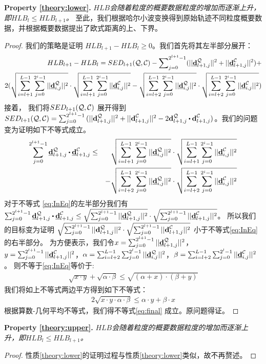 \textbf{Property \ref{theory:lower}. }{\em $HLB$会随着粒度的概要数据粒度的增加而逐渐上升，即$HLB_{l} \le HLB_{l+1}$。}
至此，我们根据哈尔小波变换得到原始轨迹不同粒度概要数据，并根据概要数据提出了欧式距离的上、下界。



\begin{proof}\label{proof:p2}
	我们的策略是证明 $HLB_{l+1}- HLB_{l}\ge 0$。我们首先将其左半部分展开：
	\begin{eqnarray}\label{eq:minus}
HLB_{l+1}- HLB_{l}= SED_{l+1}({\cal Q},{\cal C}) - \sum\nolimits_{j=0}^{2^{l+1}-1}(||\emph{{\textbf{d}}}_{l+1,j}^{\cal Q}||^2  + ||\emph{{\textbf{d}}}_{l+1,j}^{\cal C}||^2)+\nonumber\\
 2(\sqrt{\sum_{i=l+1}^{L -1}\sum_{j=0}^{2^i-1}||\emph{{\textbf{d}}}_{i,j}^{\cal Q}||^2} \cdot \sqrt{\sum_{i=l+1}^{L -1}\sum_{j=0}^{2^i-1}||\emph{{\textbf{d}}}_{i,j}^{\cal C}||^2} -\sqrt{\sum_{i=l+2}^{L -1}\sum_{j=0}^{2^i-1}||\emph{{\textbf{d}}}_{i,j}^{\cal Q}||^2} \cdot \sqrt{\sum_{i=l+2}^{L -1}\sum_{j=0}^{2^i-1}||\emph{{\textbf{d}}}_{i,j}^{\cal C}||^2})\nonumber
	\end{eqnarray}	
	接着， 我们将$SED_{l+1}({\cal Q},{\cal C})$ 展开得到$SED_{l+1}({\cal Q},{\cal C})=\sum_{j=0}^{2^{l+1}-1}{(||\bd_{l+1,j}^{\cal Q}||^2+||\bd_{l+1,j}^{\cal C}||^2}-2 \bd_{l+1,j}^{\cal Q} \bigcdot \bd_{l+1,j}^{\cal C})$。我们的问题变为证明如下不等式成立。
	\begin{eqnarray}\label{eq:InEq}
	\sum_{j=0}^{2^{l+1}-1}\vd_{l+1,j}^{\cal Q} \bigcdot \vd_{l+1,j}^{\cal C} &\le& \sqrt{\sum_{i=l+1}^{L-1}\sum_{j=0}^{2^i-1}||\vd_{i,j}^{\cal Q}||^2} \cdot \sqrt{\sum_{i=l+1}^{L-1}\sum_{j=0}^{2^i-1}||\vd_{i,j}^{\cal C}||^2} \nonumber\\
&\quad&	-	\sqrt{\sum_{i=l+2}^{L-1}\sum_{j=0}^{2^i-1}||\vd_{i,j}^{\cal Q}||^2} \cdot \sqrt{\sum_{i=l+2}^{L-1}\sum_{j=0}^{2^i-1}||\vd_{i,j}^{\cal C}||^2} 
	\end{eqnarray}	
	对于不等式 \ref{eq:InEq}的左半部分我们有
	$\sum_{j=0}^{2^{l+1}-1}\vd_{l+1,j}^{\cal Q}\bigcdot \vd_{l+1,j}^{\cal C} \le
	\sqrt{\sum_{j=0}^{2^{l+1}-1}||\vd_{l+1,j}^{\cal Q}||^2} \cdot \sqrt{\sum_{j=0}^{2^{l+1}-1}||\vd_{l+1,j}^{\cal C}||^2}$。
	所以我们的目标变为证明
	$\sqrt{\sum_{j=0}^{2^{l+1}-1}||\textbf{d}_{l+1,j}^{\cal Q}||^2} \cdot \sqrt{\sum_{j=0}^{2^{l+1}-1}||\textbf{d}_{l+1,j}^{\cal C}||^2}$
	小于不等式\ref{eq:InEq}的右半部分。
	为方便表示，我们令$x= \sum_{j=0}^{2^{l+1}-1}||\emph{{\textbf{d}}}_{l+1,j}^{\cal Q}||^2$，$y=\sum_{j=0}^{2^{l+1}-1}||\emph{{\textbf{d}}}_{l+1,j}^{\cal C}||^2$，$\alpha = \sum_{i=l+2}^{L-1}\sum_{j=0}^{2^l-1}||\emph{{\textbf{d}}}_{i,j}^{\cal Q}||^2$，$\beta =  \sum_{i=l+2}^{L-1}\sum_{j=0}^{2^l-1}||\emph{{\textbf{d}}}_{i,j}^{\cal C}||^2$。
	则不等于\ref{eq:InEq}等价于:
	\begin{eqnarray}\label{eq:sim}
	\sqrt{x \cdot y} + \sqrt{\alpha \cdot \beta} \le \sqrt{(\alpha+x) \cdot (\beta+y)}
	\end{eqnarray}	
	我们将如上不等式两边平方得到如下不等式：
	\begin{eqnarray}\label{eq:final}
	2\sqrt{x\cdot y \cdot \alpha \cdot \beta} \le \alpha \cdot y+\beta\cdot x
	\end{eqnarray}	
	根据算数-几何平均不等式，我们得不等式\ref{eq:final} 成立。原问题得证。
\end{proof}

\textbf{Property \ref{theory:upper}. }{\em $HLB$会随着粒度的概要数据粒度的增加而逐渐上升，即$HLB_{l} \le HLB_{l+1}$。}
\begin{proof}
	性质\ref{theory:lower}的证明过程与性质\ref{theory:lower}类似，故不再赘述。
\end{proof}


\clearpage
\phantom{s}
\clearpage